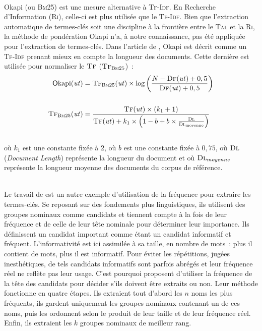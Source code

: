         ~\\Okapi (ou \textsc{Bm}25) \cite{robertson1999okapi} est une mesure
        alternative à \textsc{Tf-Idf}. En Recherche d'Information (\textsc{Ri}),
        celle-ci est plus utilisée que le \textsc{Tf-Idf}. Bien que l'extraction
        automatique de termes-clés soit une discipline à la frontière entre le
        \textsc{Tal} et la \textsc{Ri}, la méthode de pondération Okapi n'a, à
        notre connaissance, pas été appliquée pour l'extraction de termes-clés.
        Dans l'article de , Okapi est décrit
        comme un \textsc{Tf-Idf} prenant mieux en compte la longueur des
        documents. Cette dernière est utilisée pour normaliser le $\textsc{Tf}$
        ($\textsc{Tf}_{\textsc{Bm}25}$)~:
        \begin{align}
          \text{Okapi}(\text{\textit{ut}}) &= \textsc{Tf}_{\textsc{Bm}25}(\text{\textit{ut}}) \times \log\left(\frac{N - \textsc{Df}(\text{\textit{ut}}) + 0,5}{\textsc{Df}(\text{\textit{ut}}) + 0,5}\right) \label{math:okapi}\\
          \notag\\
          \textsc{Tf}_{\textsc{Bm}25}(\text{\textit{ut}}) &= \frac{\textsc{Tf}(\text{\textit{ut}}) \times (k_1 + 1)}{\textsc{Tf}(\text{\textit{ut}}) + k_1 \times \left(1 - b + b \times \frac{\textsc{Dl}}{\textsc{Dl}_{\text{moyenne}}}\right)} \label{math:tf_bm25}
        \end{align}\\
        où $k_1$ est une constante fixée à 2, où $b$ est une constante fixée à
        $0,75$, où $\textsc{Dl}$ (\textit{Document Length}) représente la
        longueur du document et où $\textsc{Dl}_{moyenne}$ représente la
        longueur moyenne des documents du corpus de référence.

        ~\\Le travail de  est un autre exemple
        d'utilisation de la fréquence pour extraire les termes-clés. Se reposant
        sur des fondements plus linguistiques, ils utilisent des groupes
        nominaux comme candidats et tiennent compte à la fois de leur fréquence
        et de celle de leur tête nominale pour déterminer leur importance. Ils
        définissent un candidat important comme étant un candidat informatif et
        fréquent. L'informativité est ici assimilée à sa taille, en nombre de
        mots~: plus il contient de mots, plus il est informatif. Pour éviter les
        répétitions, jugées inesthétiques, de tels candidats informatifs sont
        parfois abrégés et leur fréquence réel ne reflète pas leur usage. C'est
        pourquoi  proposent d'utiliser la
        fréquence de la tête des candidats pour décider s'ils doivent être
        extraits ou non. Leur méthode fonctionne en quatre étapes. Ils extraient
        tout d'abord les $n$ noms les plus fréquents, ils gardent uniquement
        les groupes nominaux contenant un de ces noms, puis les ordonnent selon
        le produit de leur taille et de leur fréquence réel. Enfin, ils
        extraient les $k$ groupes nominaux de meilleur rang.

